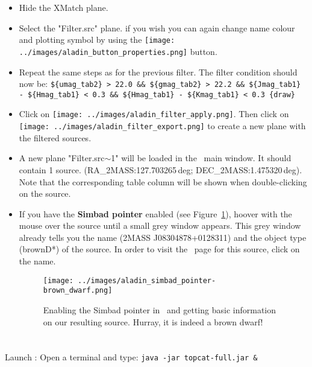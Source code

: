 \documentclass [a4paper, 12pt]{article}
\begin{document}
\begin{itemize}
    \item Hide the XMatch plane.
    \item Select the "Filter.src" plane. if you wish you can again change name
    colour and plotting symbol by using the \texttt{[image: ../images/aladin\_button\_properties.png]} button.
    \item Repeat the same steps as for the previous filter. The filter
    condition should now be: \texttt{\$\{umag\_tab2\} > 22.0 \&\&
    \$\{gmag\_tab2\} > 22.2 \&\& \$\{Jmag\_tab1\} - \$\{Hmag\_tab1\} < 0.3 \&\&
    \$\{Hmag\_tab1\} - \$\{Kmag\_tab1\} < 0.3 \{draw\}}
    \item Click on \texttt{[image: ../images/aladin\_filter\_apply.png]}. Then click on
    \texttt{[image: ../images/aladin\_filter\_export.png]} to create a new plane with
    the filtered sources.
    \item A new plane "Filter.src$\sim$1" will be loaded in the \aladin\ main
    window. It should contain 1 source. (RA\_2MASS:127.703265\,deg;
    DEC\_2MASS:1.475320\,deg). Note that the corresponding table column will be
    shown when double-clicking on the source.
    \item If you have the \textbf{Simbad pointer} enabled (see
    Figure~\ref{fig:simbadpointer_aladin}), hoover with the mouse over the
    source until a small grey window appears. This grey window already tells
    you the name (2MASS J08304878+0128311) and the object type (brownD*) of the
    source. In order to visit the \simbad\ page for this source, click on the
    name.
    \begin{figure}[H]
        \center
        \texttt{[image: ../images/aladin\_simbad\_pointer-brown\_dwarf.png]}
        \caption{Enabling the Simbad pointer in \aladin\ and getting basic
        information on our resulting source. Hurray, it is indeed a brown
        dwarf!}
        \label{fig:simbadpointer_aladin}
    \end{figure}
\end{itemize}

\section{\topcat}
Launch \topcat: Open a terminal and type: \texttt{java -jar topcat-full.jar \&}
\\
\end{document}
